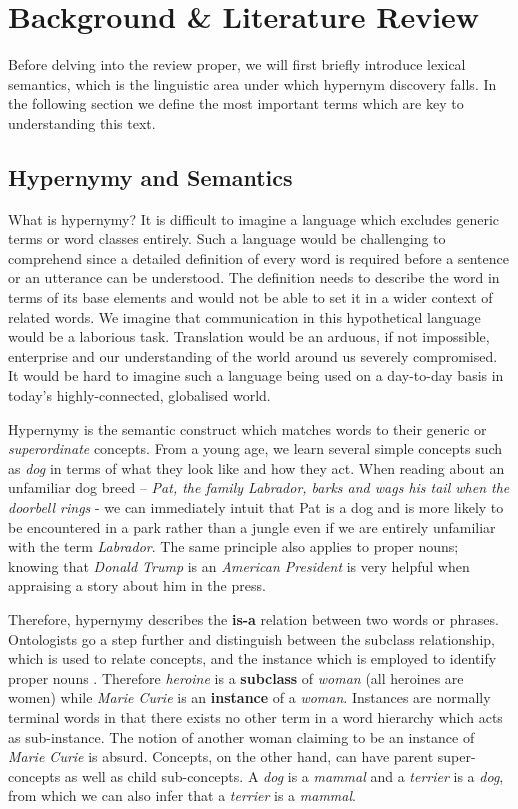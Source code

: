 \chapter{Background \& Literature Review}
Before delving into the review proper, we will first briefly introduce lexical semantics, which is the linguistic area under which hypernym discovery falls.  In the following section we define the most important terms which are key to understanding this text.

\section{Hypernymy and Semantics}
What is hypernymy?  It is difficult to imagine a language which excludes generic terms or word classes entirely.  Such a language would be challenging to comprehend since a detailed definition of every word is required before a sentence or an utterance can be understood.  The definition needs to describe the word in terms of its base elements and would not be able to set it in a wider context of related words.  We imagine that communication in this hypothetical language would be a laborious task.  Translation would be an arduous, if not impossible, enterprise and our understanding of the world around us severely compromised.  It would be hard to imagine such a language being used on a day-to-day basis in today's highly-connected, globalised world.

Hypernymy is the semantic construct which matches words to their generic or \textit{superordinate} concepts.  From a young age, we learn several simple concepts such as \textit{dog} in terms of what they look like and how they act.  When reading about an unfamiliar dog breed – \textit{Pat, the family Labrador, barks and wags his tail when the doorbell rings} - we can immediately intuit that Pat is a dog and is more likely to be encountered in a park rather than a jungle even if we are entirely unfamiliar with the term \textit{Labrador}.  The same principle also applies to proper nouns; knowing that \textit{Donald Trump} is an \textit{American President} is very helpful when appraising a story about him in the press.  

Therefore, hypernymy describes the \textbf{is-a} relation between two words or phrases.  Ontologists go a step further and distinguish between the subclass relationship, which is used to relate concepts, and the instance which is employed to identify proper nouns \citep{miller1990introduction}.  Therefore \textit{heroine} is a \textbf{subclass} of \textit{woman} (all heroines are women) while \textit{Marie Curie} is an \textbf{instance} of a \textit{woman}.  Instances are normally terminal words in that there exists no other term in a word hierarchy which acts as sub-instance.  The notion of another woman claiming to be an instance of \textit{Marie Curie} is absurd.  Concepts, on the other hand, can have parent super-concepts as well as child sub-concepts.  A \textit{dog} is a \textit{mammal} and a \textit{terrier} is a \textit{dog}, from which we can also infer that a \textit{terrier} is a \textit{mammal}.

